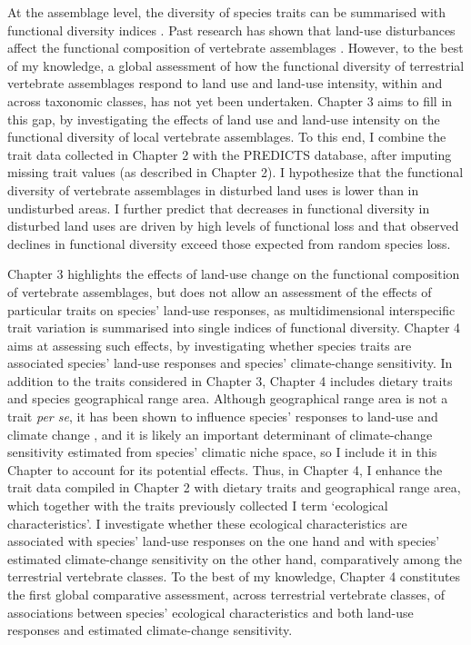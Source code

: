 At the assemblage level, the diversity of species traits can be summarised with functional diversity indices \citep{Villeger2008, Schleuter2010a, Legras2018}. Past research has shown that land-use disturbances affect the functional composition of vertebrate assemblages \citep{Flynn2009, Tinoco2018}. However, to the best of my knowledge, a global assessment of how the functional diversity of terrestrial vertebrate assemblages respond to land use and land-use intensity, within and across taxonomic classes, has not yet been undertaken. Chapter 3 aims to fill in this gap, by investigating the effects of land use and land-use intensity on the functional diversity of local vertebrate assemblages. To this end, I combine the trait data collected in Chapter 2 with the PREDICTS database, after imputing missing trait values (as described in Chapter 2). I hypothesize that the functional diversity of vertebrate assemblages in disturbed land uses is lower than in undisturbed areas. I further predict that decreases in functional diversity in disturbed land uses are driven by high levels of functional loss and that observed declines in functional diversity exceed those expected from random species loss. 

Chapter 3 highlights the effects of land-use change on the functional composition of vertebrate assemblages, but does not allow an assessment of the effects of particular traits on species' land-use responses, as multidimensional interspecific trait variation is summarised into single indices of functional diversity. Chapter 4 aims at assessing such effects, by investigating whether species traits are associated species' land-use responses and species' climate-change sensitivity. In addition to the traits considered in Chapter 3, Chapter 4 includes dietary traits and species geographical range area. Although geographical range area is not a trait \textit{per se}, it has been shown to influence species' responses to land-use and climate change \citep{Thuiller2005, Newbold2018a}, and it is likely an important determinant of climate-change sensitivity estimated from species' climatic niche space, so I include it in this Chapter to account for its potential effects. Thus, in Chapter 4, I enhance the trait data compiled in Chapter 2 with dietary traits and geographical range area, which together with the traits previously collected I term `ecological characteristics'. I investigate whether these ecological characteristics are associated with species' land-use responses on the one hand and with species' estimated climate-change sensitivity on the other hand, comparatively among the terrestrial vertebrate classes. To the best of my knowledge, Chapter 4 constitutes the first global comparative assessment, across terrestrial  vertebrate classes, of associations between species' ecological characteristics and both land-use responses and estimated climate-change sensitivity.

